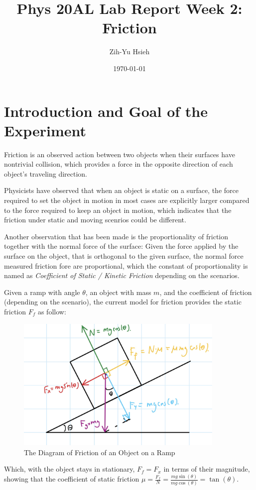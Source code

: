 \documentclass{article}
\title{Phys 20AL Lab Report Week 2: Friction}
\author{Zih-Yu Hsieh}
\date{\today}
\begin{document}
\maketitle

\tableofcontents

\pagebreak 

\section{Introduction and Goal of the Experiment}
Friction is an observed action between two objects when their surfaces have nontrivial collision, which provides a force in the opposite direction of each object's traveling direction.

Physicists have observed that when an object is static on a surface, the force required to set the object in motion in most cases are explicitly larger compared to the force required to keep an object in motion, which indicates that the friction under static and moving scenrios could be different.

Another observation that has been made is the proportionality of friction together with the normal force of the surface: Given the force applied by the surface on the object, that is orthogonal to the given surface, the normal force measured friction fore are proportional, which the constant of proportionality is named as \emph{Coefficient of Static / Kinetic Friction} depending on the scenarios.

\hfil

Given a ramp with angle $\theta$, an object with mass $m$, and the coefficient of friction (depending on the scenario), the current model for friction provides the static friction $F_f$ as follow:
\begin{figure}[h!]
    \centering
    \includegraphics[width=100mm]{friction_explain.jpg}
    \caption{The Diagram of Friction of an Object on a Ramp}
    \label{graph:friction-diagram}
\end{figure}
Which, with the object stays in stationary, $F_f=F_x$ in terms of their magnitude, showing that the coefficient of static friction $\mu = \frac{F_f}{N}=\frac{mg\sin(\theta)}{mg\cos(\theta)} = \tan(\theta)$.
\end{document}
